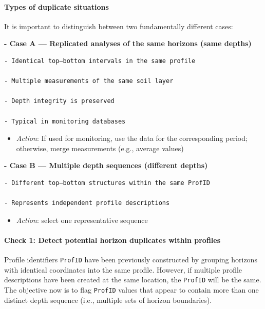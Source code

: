 \documentclass[
  10pt,
  b5paper,
  oneside]{book}
\providecommand{\tightlist}{%
  \setlength{\itemsep}{0pt}\setlength{\parskip}{0pt}}
\begin{document}
\paragraph*{Types of duplicate situations}\label{types-of-duplicate-situations}

It is important to distinguish between two fundamentally different cases:

\textbf{- Case A --- Replicated analyses of the same horizons (same depths)}

\begin{verbatim}
- Identical top–bottom intervals in the same profile

- Multiple measurements of the same soil layer

- Depth integrity is preserved

- Typical in monitoring databases
\end{verbatim}

\begin{itemize}
\tightlist
\item
  \emph{Action}: If used for monitoring, use the data for the corresponding period; otherwise, merge measurements (e.g., average values)
\end{itemize}

\textbf{- Case B --- Multiple depth sequences (different depths)}

\begin{verbatim}
- Different top–bottom structures within the same ProfID

- Represents independent profile descriptions
\end{verbatim}

\begin{itemize}
\tightlist
\item
  \emph{Action}: select one representative sequence
\end{itemize}

\paragraph*{Check 1: Detect potential horizon duplicates within profiles}\label{check-1-detect-potential-horizon-duplicates-within-profiles}

Profile identifiers \texttt{ProfID} have been previously constructed by grouping horizons with identical coordinates into the same profile. However, if multiple profile descriptions have been created at the same location, the \texttt{ProfID} will be the same. The objective now is to flag \texttt{ProfID} values that appear to contain more than one distinct depth sequence (i.e., multiple sets of horizon boundaries).
\end{document}
